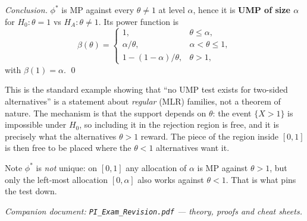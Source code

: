 \documentclass[11pt]{article}
\begin{document}
\emph{Conclusion.} $\phi^*$ is MP against every $\theta\ne1$ at level $\alpha$, hence it is
\textbf{UMP of size $\alpha$} for $H_0:\theta=1$ vs $H_A:\theta\ne1$. Its power function is
\[
\beta(\theta)=\begin{cases}
1,&\theta\le\alpha,\\
\alpha/\theta,&\alpha<\theta\le1,\\
1-(1-\alpha)/\theta,&\theta>1,
\end{cases}
\]
with $\beta(1)=\alpha$. \qed

\begin{notebox}
This is the standard example showing that ``no UMP test exists for two-sided alternatives'' is
a statement about \emph{regular} (MLR) families, not a theorem of nature. The mechanism is
that the support depends on $\theta$: the event $\{X>1\}$ is impossible under $H_0$, so
including it in the rejection region is free, and it is precisely what the alternatives
$\theta>1$ reward. The piece of the region inside $[0,1]$ is then free to be placed where the
$\theta<1$ alternatives want it.

Note $\phi^*$ is \emph{not} unique: on $[0,1]$ any allocation of $\alpha$ is MP against
$\theta>1$, but only the left-most allocation $[0,\alpha]$ also works against $\theta<1$.
That is what pins the test down.
\end{notebox}

\vfill
\begin{center}
\small\itshape Companion document: \texttt{PI\_Exam\_Revision.pdf} --- theory, proofs and cheat sheets.
\end{center}
\end{document}
